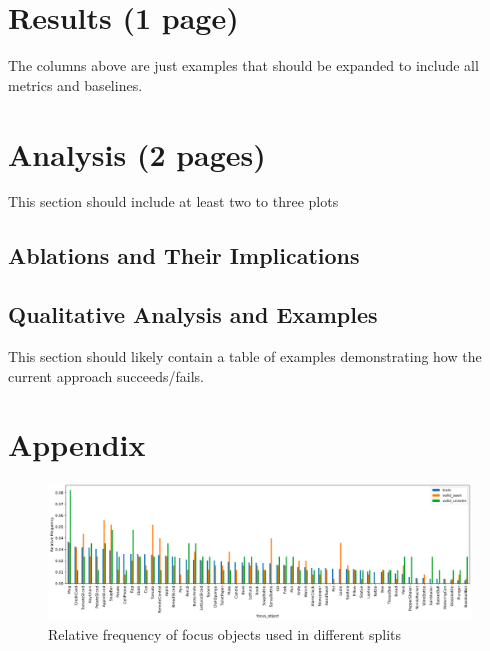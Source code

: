 \documentclass[11pt,a4paper]{article}
\begin{document}
\section{Results (1 page)}
The columns above are just examples that should be expanded to include all metrics and baselines.

\clearpage
\section{Analysis (2 pages)}
This section should include at least two to three plots
\subsection{Ablations and Their Implications}

\subsection{Qualitative Analysis and Examples}
This section should likely contain a table of examples demonstrating how the current approach succeeds/fails.




\clearpage
\section{Appendix}

\begin{figure}
    \centering
    \includegraphics[scale=0.3]{figures/focus_obj_freqs.png}
    \caption{Relative frequency of focus objects used in different splits}
    \label{fig:focus}
\end{figure}
\end{document}
